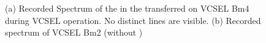 \begin{figure}[tp]
\begin{subfigure}[t]{ 0.49\linewidth}
			\caption{}
			\label{subfig::spectrum_vcsel_excitation_without_diamond}
		\end{subfigure}
		\caption{(a) Recorded Spectrum of the \siv in the transferred \nd on VCSEL Bm4 during VCSEL operation. No distinct \siv lines are visible. (b) Recorded spectrum of VCSEL Bm2 (without \siv)}
		\label{fig::vcsel_spectra}
	\end{figure}


